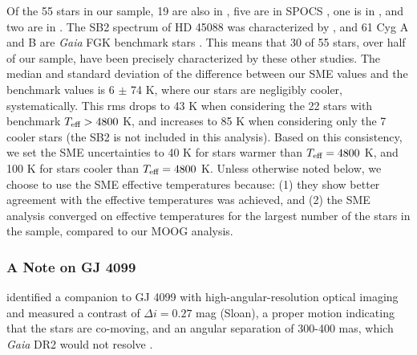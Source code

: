 Of the 55 stars in our sample, 19 are also in \citet{Brewer2016}, five are in SPOCS \citep{Valenti2005}, one is in \citet{boyajian2012}, and two are in \citet{Mann2015}. 
The SB2 spectrum of HD 45088 was characterized by \citet{Glazunova2014}, and 
61 Cyg A and B are \textit{Gaia} FGK benchmark stars \citet{Heiter2015}. 
This means that 30 of 55 stars, over half of our sample, have been precisely characterized by these other studies.
The median and standard deviation of the difference between our SME values and the benchmark values is 6 $\pm$ 74 K, where our stars are negligibly cooler, systematically.
This rms drops to 43 K when considering the 22 stars with benchmark $T_{\mbox{\scriptsize eff}} > 4800$ K, 
and increases to 85 K when considering only the 7 cooler stars (the SB2 is not included in this analysis).
Based on this consistency, we 
set the SME uncertainties to 40 K for stars warmer than $T_{\mbox{\scriptsize eff}} = 4800$ K, and 100 K for stars cooler than $T_{\mbox{\scriptsize eff}} = 4800$ K.
Unless otherwise noted below, we choose to use the SME effective temperatures because: (1) they show better agreement with the \gaia effective temperatures was achieved, and (2) the SME analysis converged on effective temperatures for the largest number of the stars in the sample, compared to our MOOG analysis.



\subsubsection{A Note on GJ 4099}
\citet{GJ4099binary} identified a companion to GJ 4099 with 
high-angular-resolution optical imaging
and measured a contrast of $\Delta i = 0.27$ mag (Sloan),
a proper motion indicating that the stars are co-moving, 
and an angular separation of 300-400 mas, 
which \textit{Gaia} DR2 would not resolve \citep[see Figure 1 from][]{Ziegler2018}.

